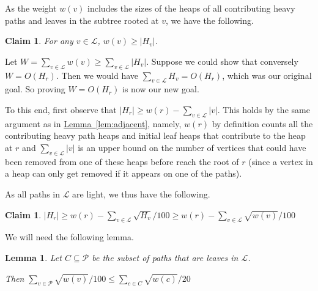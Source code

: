 \documentclass[11pt]{article}
\newtheorem{lemma}[theorem]{Lemma}
\newtheorem{claim}[theorem]{Claim}
\theoremstyle{definition}
\newcommand{\Lem}[1]{\hyperref[lem:#1]{Lemma~\ref*{lem:#1}}} %
\begin{document}
As the weight $w(v)$ includes the sizes of the heaps of all contributing heavy paths and leaves in the subtree rooted at $v$, we have the following.

\begin{claim}
For any $v\in \mathcal{L}$, $w(v)\geq |H_v|$.
\end{claim}

Let $W= \sum_{v\in \mathcal{L}} w(v) \geq \sum_{v\in \mathcal{L}} |H_v|$.  Suppose we could show that conversely $W=O(H_r)$.  
Then we would have $\sum_{v\in \mathcal{L}} H_v = O(H_r)$, which was our original goal.  So proving $W=O(H_r)$ is now our new goal.

To this end, first observe that $|H_r|\geq w(r)-\sum_{v\in \mathcal{L}} |v|$.  This holds by the same argument as in \Lem{adjacent}, namely, 
$w(r)$ by definition counts all the contributing heavy path heaps and initial leaf heaps that contribute to the heap at $r$ and $\sum_{v\in \mathcal{L}} |v|$
is an upper bound on the number of vertices that could have been removed from one of these heaps before reach the root of $r$ (since a vertex in a heap can only 
get removed if it appears on one of the paths).  

As all paths in $\mathcal{L}$ are light, we thus have the following.

\begin{claim}
$|H_r|\geq w(r)-\sum_{v\in \mathcal{L}} \sqrt{H_v}/100 \geq w(r)-\sum_{v\in \mathcal{L}} \sqrt{w(v)}/100$
\end{claim}

We will need the following lemma.

\begin{lemma}
\label{lem:distribution}
Let $C\subseteq \mathcal{P}$ be the subset of paths that are leaves in $\mathcal{L}$.

Then $\sum_{v\in \mathcal{P}} \sqrt{w(v)}/100 \leq \sum_{c\in C} \sqrt{w(c)}/20$
\end{lemma}
\end{document}
